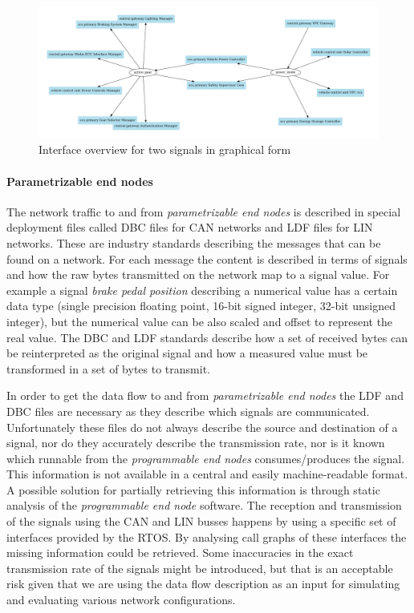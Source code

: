 \begin{figure}[htb]
    \centering
    \includegraphics[width=\textwidth]{images/interface_overview.pdf}
    \caption{Interface overview for two signals in graphical form}
    \label{fig:interface_overview}
\end{figure}

\paragraph{Parametrizable end nodes}
The network traffic to and from \textit{parametrizable end nodes} is described in special deployment files called DBC files for CAN networks and LDF files for LIN networks. These are industry standards describing the messages that can be found on a network. For each message the content is described in terms of signals and how the raw bytes transmitted on the network map to a signal value. For example a signal \textit{brake pedal position} describing a numerical value has a certain data type (single precision floating point, 16-bit signed integer, 32-bit unsigned integer), but the numerical value can be also scaled and offset to represent the real value. The DBC and LDF standards describe how a set of received bytes can be reinterpreted as the original signal and how a measured value must be transformed in a set of bytes to transmit. 

In order to get the data flow to and from \textit{parametrizable end nodes} the LDF and DBC files are necessary as they describe which signals are communicated. Unfortunately these files do not always describe the source and destination of a signal, nor do they accurately describe the transmission rate, nor is it known which runnable from the \textit{programmable end nodes} consumes/produces the signal. This information is not available in a central and easily machine-readable format. A possible solution for partially retrieving this information is through static analysis of the \textit{programmable end node} software. The reception and transmission of the signals using the CAN and LIN busses happens by using a specific set of interfaces provided by the RTOS. By analysing call graphs of these interfaces the missing information could be retrieved. Some inaccuracies in the exact transmission rate of the signals might be introduced, but that is an acceptable risk given that we are using the data flow description as an input for simulating and evaluating various network configurations.

